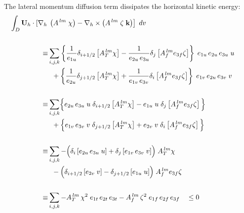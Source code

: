 \documentclass[../main/NEMO_manual]{subfiles}
\begin{document}
The lateral momentum diffusion term dissipates the horizontal kinetic energy:
\[
  \begin{split}
    \int_D \textbf{U}_h \cdot
    \left[ \nabla_h 		\right.   &     \left.       \left( A^{\,lm}\;\chi \right)
      - \nabla_h \times  \left( A^{\,lm}\;\zeta \;\textbf{k} \right)     \right] \; dv    \\
    \\  %
    \equiv& \sum\limits_{i,j,k}
    \left\{
      \frac{1} {e_{1u}}               \delta_{i+1/2} \left[  A_T^{\,lm}          \chi     \right]
      - \frac{1} {e_{2u}\,e_{3u}}  \delta_j           \left[ A_f^{\,lm} e_{3f} \zeta   \right]
    \right\} \; e_{1u}\,e_{2u}\,e_{3u} \;u     \\
    &\;\; + 	\left\{
	   \frac{1} {e_{2u}}             \delta_{j+1/2}	\left[ A_T^{\,lm}          \chi    \right]
      + \frac{1} {e_{1v}\,e_{3v}} \delta_i            \left[ A_f^{\,lm} e_{3f} \zeta  \right]
    \right\} \; e_{1v}\,e_{2u}\,e_{3v} \;v     \qquad \\
    \\  %
    \equiv& \sum\limits_{i,j,k}
    \Bigl\{
    e_{2u}\,e_{3u} \;u\;  \delta_{i+1/2} \left[ A_T^{\,lm}           \chi    \right]
    - e_{1u}             \;u\;  \delta_j           \left[ A_f^{\,lm} e_{3f} \zeta  \right]
	 \Bigl\}
	 \\
    &\;\; + \Bigl\{
    e_{1v}\,e_{3v} \;v\;  \delta_{j+1/2}  \left[ A_T^{\,lm}           \chi    \right]
    + e_{2v}             \;v\;  \delta_i            \left[ A_f^{\,lm} e_{3f} \zeta  \right]
    \Bigl\}      \\
    \\  %
    \equiv& \sum\limits_{i,j,k}
    - \Bigl(
    \delta_i   \left[  e_{2u}\,e_{3u} \;u  \right]
    + \delta_j  \left[  e_{1v}\,e_{3v}  \;v  \right]
    \Bigr) \;  A_T^{\,lm} \chi   \\
    &\;\; - \Bigl(
    \delta_{i+1/2}  \left[  e_{2v}  \;v  \right]
    - \delta_{j+1/2}  \left[  e_{1u} \;u  \right]
    \Bigr)\;  A_f^{\,lm} e_{3f} \zeta      \\
    \\  %
    \equiv& \sum\limits_{i,j,k}
    - A_T^{\,lm}  \,\chi^2   \;e_{1t}\,e_{2t}\,e_{3t}
    - A_f ^{\,lm}  \,\zeta^2 \;e_{1f }\,e_{2f }\,e_{3f}
    \quad \leq 0       \\
  \end{split}
\]

\end{document}
